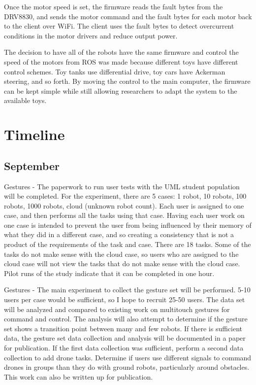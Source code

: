 \documentclass[]{article}
\begin{document}
Once the motor speed is set, the firmware reads the fault bytes from the DRV8830, and sends the motor command and the fault bytes for each motor back to the client over WiFi. 
The client uses the fault bytes to detect overcurrent conditions in the motor drivers and reduce output power. 

The decision to have all of the robots have the same firmware and control the speed of the motors from ROS was made because different toys have different control schemes. 
Toy tanks use differential drive, toy cars have Ackerman steering, and so forth. 
By moving the control to the main computer, the firmware can be kept simple while still allowing researchers to adapt the system to the available toys.

\section{Timeline}

\subsection{September}

Gestures - The paperwork to run user tests with the UML student population will be completed.  
For the experiment, there are 5 cases: 1 robot, 10 robots, 100 robots, 1000 robots, cloud (unknown robot count). 
Each user is assigned to one case, and then performs all the tasks using that case. 
Having each user work on one case is intended to prevent the user from being influenced by their memory of what they did in a different case, and so creating a consistency that is not a product of the requirements of the task and case. 
There are 18 tasks. 
Some of the tasks do not make sense with the cloud case, so users who are assigned to the cloud case will not view the tasks that do not make sense with the cloud case. 
Pilot runs of the study indicate that it can be completed in one hour. 

Gestures - The main experiment to collect the gesture set will be performed. 
5-10 users per case would be sufficient, so I hope to recruit 25-50 users. 
The data set will be analyzed and compared to existing work on multitouch gestures for command and control. 
The analysis will also attempt to determine if the gesture set shows a transition point between many and few robots. 
If there is sufficient data, the gesture set data collection and analysis will be documented in a paper for publication. 
If the first data collection was sufficient, perform a second data collection to add drone tasks. 
Determine if users use different signals to command drones in groups than they do with ground robots, particularly around obstacles. 
This work can also be written up for publication. 
\end{document}

